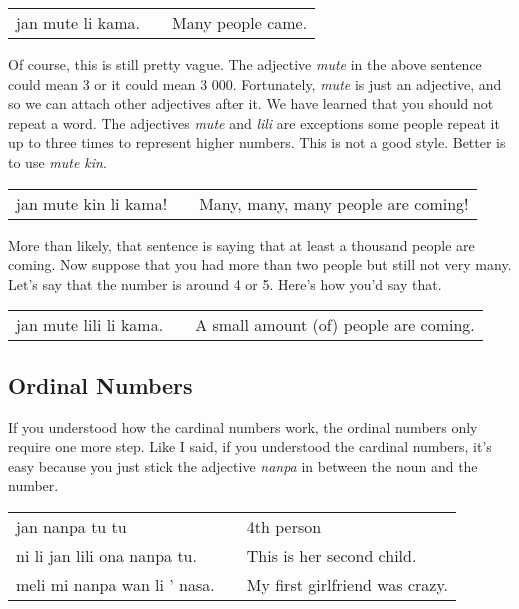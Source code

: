 \begin{supertabular}{p{5,5cm}|ll}
    jan mute li kama. &  & Many people came. \\
\end{supertabular}

Of course, this is still pretty vague.
The adjective \textit{mute} in the above sentence could mean 3 or it could mean 3 000.
Fortunately, \textit{mute} is just an adjective, and so we can attach other adjectives after it.
We have learned that you should not repeat a word.
The adjectives \textit{mute} and \textit{lili} are exceptions some people repeat it up to three times to represent higher numbers.
This is not a good style.
Better is to use \textit{mute kin}.

\begin{supertabular}{p{5,5cm}|ll}
    jan mute kin li kama! &  & Many, many, many people are coming! \\
\end{supertabular}

More than likely, that sentence is saying that at least a thousand people are coming.
Now suppose that you had more than two people but still not very many.
Let's say that the number is around 4 or 5. Here's how you'd say that.

\begin{supertabular}{p{5,5cm}|ll}
    jan mute lili li kama. &  & A small amount (of) people are coming. \\
\end{supertabular}
%
%
\subsection*{Ordinal Numbers}
%
%
If you understood how the cardinal numbers work, the ordinal numbers only require one more step.
Like I said, if you understood the cardinal numbers, it's easy because you just stick the adjective \textit{nanpa} in between the noun and the number.

\begin{supertabular}{p{5,5cm}|ll}
    jan nanpa tu tu              &  & 4th person                     \\
    ni li jan lili ona nanpa tu. &  & This is her second child.      \\
    meli mi nanpa wan li ' nasa. &  & My first girlfriend was crazy. \\
\end{supertabular}

